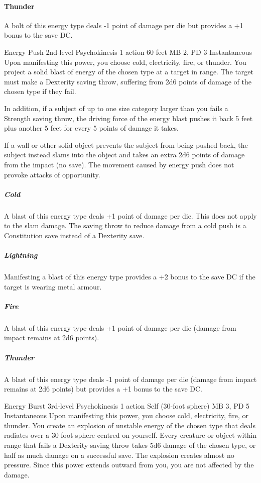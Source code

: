   \paragraph{Thunder}
  A bolt of this energy type deals -1 point of damage per die
  but provides a +1 bonus to the save DC.

\DndPowerHeader%
  {Energy Push}
  {2nd-level Psychokinesis}
  {1 action}
  {60 feet}
  {MB 2, PD 3}
  {Instantaneous}
  Upon manifesting this power, you choose cold, electricity, fire, or thunder.
  You project a solid blast of energy of the chosen type at a target in range.
  The target must make a Dexterity saving throw,
  suffering from 2d6 points of damage of the chosen type if they fail.
  
  In addition, if a subject of up to one size category larger than you
  fails a Strength saving throw,
  the driving force of the energy blast pushes it back 5 feet
  plus another 5 feet for every 5 points of damage it takes.
  
  If a wall or other solid object prevents the subject from being pushed back,
  the subject instead slams into the object and takes an extra
  2d6 points of damage from the impact (no save).
  The movement caused by energy push does not provoke attacks of opportunity.
  \subparagraph{Cold}
    A blast of this energy type deals +1 point of damage per die.
    This does not apply to the slam damage.
    The saving throw to reduce damage from a cold push
    is a Constitution save instead of a Dexterity save.
  \subparagraph{Lightning}
    Manifesting a blast of this energy type provides a +2 bonus
    to the save DC if the target is wearing metal armour.
  \subparagraph{Fire}
    A blast of this energy type deals +1 point of damage per die
    (damage from impact remains at 2d6 points).
  \subparagraph{Thunder}
    A blast of this energy type deals -1 point of damage per die
    (damage from impact remains at 2d6 points)
    but provides a +1 bonus to the save DC.

\DndPowerHeader%
  {Energy Burst}
  {3rd-level Psychokinesis}
  {1 action}
  {Self (30-foot sphere)}
  {MB 3, PD 5}
  {Instantaneous}
Upon manifesting this power, you choose cold, electricity,
fire, or thunder.
You create an explosion of unstable energy of the chosen type
that deals radiates over a 30-foot sphere
centred on yourself.
Every creature or object within range that fails a Dexterity saving throw
takes 5d6 damage of the chosen type, or
half as much damage on a successful save.
The explosion creates almost no pressure.
Since this power extends outward from you,
you are not affected by the damage.

